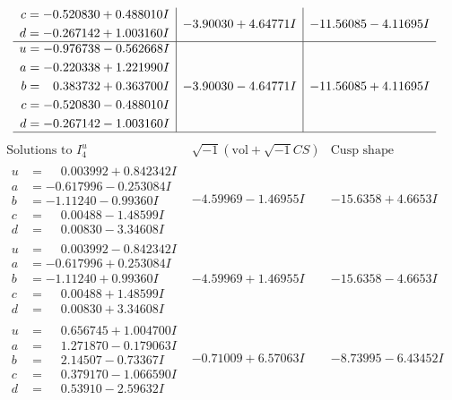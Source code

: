 \documentclass[1p]{elsarticle_modified}
\theoremstyle{definition}
\newcommand{\I}{\sqrt{-1}}
\begin{document}
$$\begin{array}{c|c|c}
\begin{aligned}
c &= -0.520830 + 0.488010 I \\
d &= -0.267142 + 1.003160 I\end{aligned}
 & -3.90030 + 4.64771 I & -11.56085 - 4.11695 I \\ \hline\begin{aligned}
u &= -0.976738 - 0.562668 I \\
a &= -0.220338 + 1.221990 I \\
b &= \phantom{-}0.383732 + 0.363700 I \\
c &= -0.520830 - 0.488010 I \\
d &= -0.267142 - 1.003160 I\end{aligned}
 & -3.90030 - 4.64771 I & -11.56085 + 4.11695 I\\
 \hline 
 \end{array}$$\newpage$$\begin{array}{c|c|c}  
\text{Solutions to }I^u_{4}& \I (\text{vol} + \sqrt{-1}CS) & \text{Cusp shape}\\
 \hline 
\begin{aligned}
u &= \phantom{-}0.003992 + 0.842342 I \\
a &= -0.617996 - 0.253084 I \\
b &= -1.11240 - 0.99360 I \\
c &= \phantom{-}0.00488 - 1.48599 I \\
d &= \phantom{-}0.00830 - 3.34608 I\end{aligned}
 & -4.59969 - 1.46955 I & -15.6358 + 4.6653 I \\ \hline\begin{aligned}
u &= \phantom{-}0.003992 - 0.842342 I \\
a &= -0.617996 + 0.253084 I \\
b &= -1.11240 + 0.99360 I \\
c &= \phantom{-}0.00488 + 1.48599 I \\
d &= \phantom{-}0.00830 + 3.34608 I\end{aligned}
 & -4.59969 + 1.46955 I & -15.6358 - 4.6653 I \\ \hline\begin{aligned}
u &= \phantom{-}0.656745 + 1.004700 I \\
a &= \phantom{-}1.271870 - 0.179063 I \\
b &= \phantom{-}2.14507 - 0.73367 I \\
c &= \phantom{-}0.379170 - 1.066590 I \\
d &= \phantom{-}0.53910 - 2.59632 I\end{aligned}
 & -0.71009 + 6.57063 I & -8.73995 - 6.43452 I \\ \hline\begin{aligned}

\end{aligned}
\end{array}$$
\end{document}
